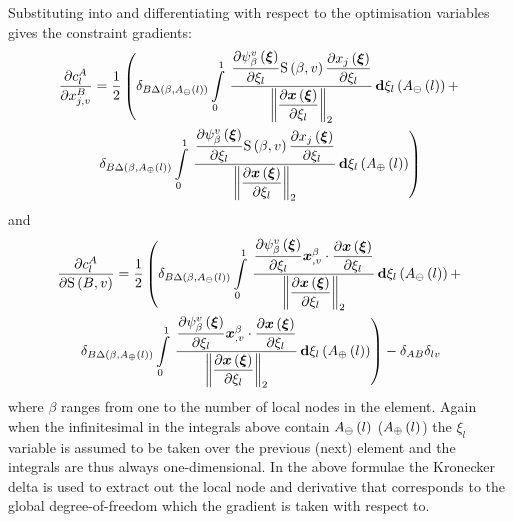 Substituting  into 
and differentiating with respect to the optimisation variables gives the
constraint gradients: 
\begin{multline}
  \delby{c_{l}^{A}}{x^{B}_{j,v}}=\dfrac{1}{2}\left(\kronecker{B}{
      \fnof{\Delta}{\beta,\fnof{A_{\ominus}}{l}}}\gint{0}{1}{\dfrac{\delby{
          \gbfn{\beta}{v}{\vectr{\xi}}}{\xi_{l}}\gsf{\beta}{v}
        \delby{\fnof{x_{j}}{\vectr{\xi}}}{\xi_{l}}}{\norm{\delby{\fnof{
              \vectr{x}}{\vectr{\xi}}}{\xi_{l}}}}}{\fnof{\xi_{l}}{
        \fnof{A_{\ominus}}{l}}+\right.\\  
    \left.\kronecker{B}{\fnof{\Delta}{\beta,\fnof{A_{\oplus}}{l}}}\gint{0}{1}{
        \dfrac{\delby{\gbfn{\beta}{v}{\vectr{\xi}}}{\xi_{l}}
          \gsf{\beta}{v}\delby{\fnof{x_{j}}{
              \vectr{\xi}}}{\xi_{l}}}{\norm{\delby{\fnof{\vectr{x}}{
                \vectr{\xi}}}{\xi_{l}}}}}{\fnof{\xi_{l}}{
          \fnof{A_{\oplus}}{l}}}}\right) 
  \label{eqn:arclenjacnode}
\end{multline}
and
\begin{multline}  
  \delby{c_{l}^{A}}{\gsf{B}{v}}=\dfrac{1}{2}\left(\kronecker{B}{
      \fnof{\Delta}{\beta,\fnof{A_{\ominus}}{l}}}\gint{0}{1}{\dfrac{\delby{
          \gbfn{\beta}{v}{\vectr{\xi}}}{\xi_{l}}\dotprod{
            \vectr{x}^{\beta}_{,v}}{\delby{\fnof{\vectr{x}}{\vectr{\xi}}}{
            \xi_{l}}}}{\norm{\delby{\fnof{\vectr{x}}{\vectr{\xi}}}{\xi_{l}}}}}{
      \fnof{\xi_{l}}{\fnof{A_{\ominus}}{l}}}+\right. \\ 
  \left.\kronecker{B}{\fnof{\Delta}{\beta,\fnof{A_{\oplus}}{l}}}\gint{0}{1}{
      \dfrac{\delby{\gbfn{\beta}{v}{\vectr{\xi}}}{\xi_{l}}\dotprod{\vectr{x}^{
            \beta}_{,v}}{\delby{\fnof{\vectr{x}}{\vectr{\xi}}}
          {\xi_{l}}}}{\norm{\delby{\fnof{\vectr{x}}{\vectr{\xi}}}{\xi_{l}}}}}{
      \fnof{\xi_{l}}{\fnof{A_{\oplus}}{l}}}\right)-
  \kronecker{A}{B}\kronecker{l}{v} \label{eqn:arclenjacline}
\end{multline}
where $\beta$ ranges from one to the number of local nodes in the element.
Again when the infinitesimal in the integrals above contain
$ A_{\ominus}\left( l \right) $ ($ A_{\oplus}\left( l \right) $) the $\xi_{l}$ variable is
assumed to be taken over the previous (next) element and the integrals are
thus always one-dimensional. In the above formulae the Kronecker delta is used to
extract out the local node and derivative that corresponds to the global
degree-of-freedom which the gradient is taken with respect to.

